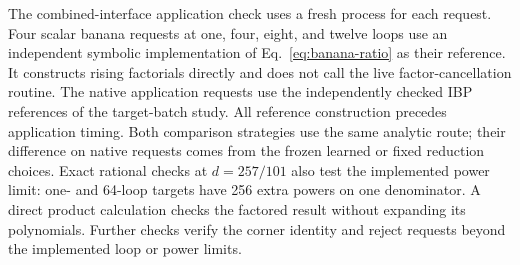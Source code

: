 The combined-interface application check uses a fresh process for each
request. Four scalar banana requests at one, four, eight, and twelve loops
use an independent symbolic implementation of Eq.~\eqref{eq:banana-ratio}
as their reference. It constructs rising factorials directly and does not
call the live factor-cancellation routine. The native application requests
use the independently checked IBP references of the target-batch study.
All reference construction precedes application timing. Both comparison
strategies use the same analytic route; their difference on native requests
comes from the frozen learned or fixed reduction choices.
Exact rational checks at $d=257/101$ also test the implemented power limit:
one- and 64-loop targets have 256 extra powers on one denominator. A direct
product calculation checks the factored result without expanding its
polynomials. Further checks verify the corner identity and reject requests
beyond the implemented loop or power limits.
